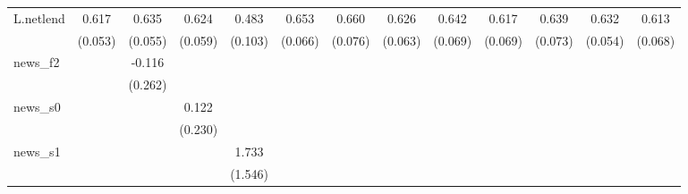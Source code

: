 {\begin{tabular}{l*{12}{c}}
\addlinespace
L.netlend   &       0.617\sym{***}&       0.635\sym{***}&       0.624\sym{***}&       0.483\sym{***}&       0.653\sym{***}&       0.660\sym{***}&       0.626\sym{***}&       0.642\sym{***}&       0.617\sym{***}&       0.639\sym{***}&       0.632\sym{***}&       0.613\sym{***}\\
            &     (0.053)         &     (0.055)         &     (0.059)         &     (0.103)         &     (0.066)         &     (0.076)         &     (0.063)         &     (0.069)         &     (0.069)         &     (0.073)         &     (0.054)         &     (0.068)         \\
\addlinespace
news\_f2     &                     &      -0.116         &                     &                     &                     &                     &                     &                     &                     &                     &                     &                     \\
            &                     &     (0.262)         &                     &                     &                     &                     &                     &                     &                     &                     &                     &                     \\
\addlinespace
news\_s0     &                     &                     &       0.122         &                     &                     &                     &                     &                     &                     &                     &                     &                     \\
            &                     &                     &     (0.230)         &                     &                     &                     &                     &                     &                     &                     &                     &                     \\
\addlinespace
news\_s1     &                     &                     &                     &       1.733         &                     &                     &                     &                     &                     &                     &                     &                     \\
            &                     &                     &                     &     (1.546)         &                     &                     &                     &                     &                     &                     &                     &                     \\

\end{tabular}}
